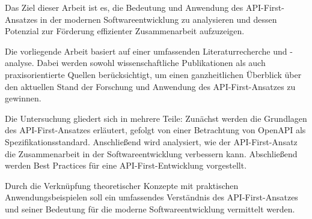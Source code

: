 Das Ziel dieser Arbeit ist es, die Bedeutung und Anwendung des \acs{API}-First-Ansatzes in der modernen Softwareentwicklung zu analysieren und dessen Potenzial zur Förderung effizienter Zusammenarbeit aufzuzeigen.

Die vorliegende Arbeit basiert auf einer umfassenden Literaturrecherche und -analyse. Dabei werden sowohl wissenschaftliche Publikationen als auch praxisorientierte Quellen berücksichtigt, um einen ganzheitlichen Überblick über den aktuellen Stand der Forschung und Anwendung des \acs{API}-First-Ansatzes zu gewinnen.

Die Untersuchung gliedert sich in mehrere Teile: Zunächst werden die Grundlagen des \acs{API}-First-Ansatzes erläutert, gefolgt von einer Betrachtung von OpenAPI als Spezifikationsstandard. Anschließend wird analysiert, wie der \acs{API}-First-Ansatz die Zusammenarbeit in der Softwareentwicklung verbessern kann. Abschließend werden Best Practices für eine \acs{API}-First-Entwicklung vorgestellt.

Durch die Verknüpfung theoretischer Konzepte mit praktischen Anwendungsbeispielen soll ein umfassendes Verständnis des \acs{API}-First-Ansatzes und seiner Bedeutung für die moderne Softwareentwicklung vermittelt werden.

